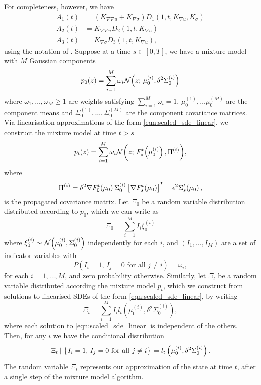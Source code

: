 For completeness, however, we have
\begin{align*}
	A_1(t) & = \left(K_{\nabla\nabla u} + K_{\nabla\sigma}\right)D_1\!\left(1, t, K_{\nabla u}, K_\sigma\right) \\
	A_2(t) & = K_{\nabla\nabla u} D_2\!\left(1, t, K_{\nabla u}\right)                                          \\
	A_3(t) & = K_{\nabla\sigma}D_3\!\left(1, t, K_{\nabla u}\right),
\end{align*}
using the notation of .
Suppose at a time \(s \in [0,T]\), we have a mixture model with \(M\) Gaussian components
\[
	p_0\!\left(z\right) = \sum_{i=1}^{M}{\omega_i\mathcal{N}\!\left(z;\, \mu_0^{(i)}, \delta^2\Sigma_0^{(i)}\right)}
\]
where \(\omega_1,\dotsc, \omega_M \geq 1\) are weights satisfying \(\sum_{i=1}^M{\omega_i} = 1\), \(\mu_0^{(1)}, \dots \mu_0^{(M)}\) are the component means and \(\Sigma_0^{(1)}, \dotsc, \Sigma_0^{(M)}\) are the component covariance matrices.
Via linearisation approximations of the form \cref{eqn:scaled_sde_linear}, we construct the mixture model at time \(t > s\)
\[
	p_t\!\left(z\right) = \sum_{i=1}^{M}{\omega_i\mathcal{N}\!\left(z; \, F_s^t\!\left(\mu_0^{(i)}\right), \Pi^{(i)}\right)},
\]
where
\[
	\Pi^{(i)} = \delta^2 \nabla F_0^t\!\left(\mu_0\right) \Sigma_0^{(i)} \left[\nabla F_s^t\!\left(\mu_0\right)\right]^{^{\intercal}} + \epsilon^2 \Sigma_s^t\!\left(\mu_0\right),
\]
is the propagated covariance matrix.
Let \(\Xi_0\) be a random variable distribution distributed according to \(p_0\), which we can write as
\[
	\Xi_0 = \sum_{i=1}^{M}{I_i \xi_0^{(i)}}
\]
where \(\xi_0^{(i)} \sim\mathcal{N}\!\left(\mu_0^{(i)}, \Sigma_0^{(i)}\right)\) independently for each \(i\), and \(\left(I_1, \dotsc, I_M\right)\) are a set of indicator variables with
\[
	P\!\left(I_i = 1,\, I_j = 0 \text{ for all } j \neq i\right) = \omega_i,
\]
for each \(i = 1,\hdots,M\), and zero probability otherwise.
Similarly, let \(\Xi_t\) be a random variable distributed according the mixture model \(p_t\), which we construct from solutions to linearised SDEs of the form \cref{eqn:scaled_sde_linear}, by writing
\[
	\Xi_t = \sum_{i=1}^{M}{I_i l_t\!\left(\mu_0^{(i)}, \delta^2\Sigma_0^{(i)}\right)},
\]
where each solution to \cref{eqn:scaled_sde_linear} is independent of the others.
Then, for any \(i\) we have the conditional distribution
\[
	\left. \Xi_t \, | \, \set{I_i = 1, \, I_j = 0 \text{ for all } j \neq i} \right. = l_{t}\left(\mu_0^{(i)}, \delta^2 \Sigma_0^{(i)}\right).
\]
The random variable \(\Xi_t\) represents our approximation of the state at time \(t\), after a single step of the mixture model algorithm.
